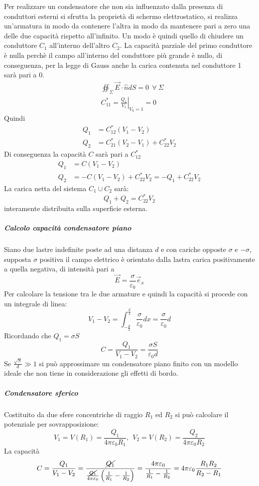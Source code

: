 Per realizzare un condensatore che non sia influenzato dalla presenza di conduttori esterni
si sfrutta la proprietà di schermo elettrostatico, si realizza un'armatura in modo da contenere
l'altra in modo da mantenere pari a zero una delle due capacità rispetto all'infinito.
Un modo è quindi quello di chiudere un conduttore $C_1$ all'interno dell'altro $C_2$.
La capacità parziale del primo conduttore è nulla perchè il campo all'interno del conduttore
più grande è nullo, di conseguenza, per la legge di Gauss anche la carica contenuta nel conduttore
1 sarà pari a 0.
$$\begin{aligned}
& \oiint_{\Sigma}\vec{E}\cdot\hat{n}dS = 0\ \ \forall \ \Sigma\\
&C_{11}^* = \left.\frac{Q_1}{V_1}\right|_{V_k = 1} = 0
\end{aligned}
$$
Quindi 
$$
\begin{aligned}
Q_1 &= C_{12}^*(V_1-V_2) \\
Q_2 &= C_{21}^*(V_2-V_1) + C_{22}^*V_2
\end{aligned}
$$
Di conseguenza la capacità $C$ sarà pari a $C_{12}^*$
$$
\begin{aligned}
Q_1 &= C(V_1-V_2) \\
Q_2 &= -C(V_1-V_2) + C_{22}^*V_2 = -Q_1 + C_{22}^*V_2
\end{aligned}
$$
La carica netta del sistema $C_1 \cup C_2$ sarà:
$$
Q_1+Q_2 = C_{22}^*V_2
$$
interamente distribuita sulla superficie esterna.

\subparagraph{Calcolo capacità condensatore piano}
Siano due lastre indefinite poste ad una distanza $d$ e con cariche opposte
$\sigma$ e $-\sigma$, supposta $\sigma$ positiva il campo elettrico è orientato dalla
lastra carica positivamente a quella negativa, di intensità pari a 
$$
\vec{E} = \frac{\sigma}{\varepsilon_0} \vec{e}_x
$$
Per calcolare la tensione tra le due armature e quindi la capacità si procede con un integrale di 
linea:
$$
V_1-V_2 = \int_{-\frac{d}{2}}^{\frac{d}{2}} \frac{\sigma}{\varepsilon_0} dx = \frac{\sigma}{\varepsilon_0} d
$$
Ricordando che $Q_1 = \sigma S$ 
$$
C = \frac{Q_1}{V_1-V_2} = \frac{\sigma S}{\varepsilon_0 d}
$$
Se $\frac{\sqrt{S}}{d} \gg 1 $ si può approssimare un condensatore piano finito con un modello
ideale che non tiene in considerazione gli effetti di bordo.

\subparagraph{Condensatore sferico}
Costituito da due sfere concentriche di raggio $R_1$ ed $R_2$
si può calcolare il potenziale per sovrapposizione:
$$
V_1 = V(R_1) = \frac{Q_1}{4\pi \varepsilon_0 R_1},\ \ V_2 = V(R_2) = \frac{Q_2}{4 \pi \varepsilon_0 R_2}
$$
La capacità
$$
C = \frac{Q_1}{V_1 - V_2} = \frac{\cancel{Q_1}}{\frac{\cancel{Q_1}}{4 \pi \varepsilon_0}\left(\frac{1}{R_1}-\frac{1}{R_2}\right)} = \frac{4 \pi \varepsilon_0}{\frac{1}{R_1}-\frac{1}{R_2}} = 4 \pi \varepsilon_0 \frac{R_1 R_2}{R_2 - R_1}
$$

